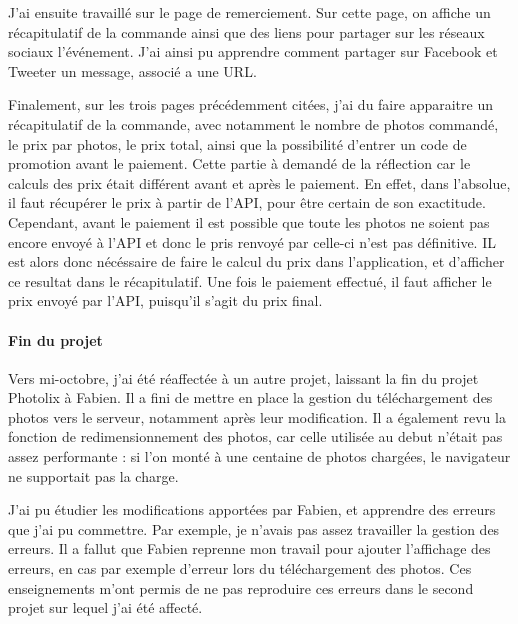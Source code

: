 \documentclass[12pt,a4paper]{article}
\begin{document}
  \bigskip

  J'ai ensuite travaillé sur le page de remerciement. Sur cette page, on
  affiche un récapitulatif de la commande ainsi que des liens pour
  partager sur les réseaux sociaux l'événement. J'ai ainsi pu apprendre
  comment partager sur Facebook et Tweeter un message, associé a une URL.

  \bigskip

  Finalement, sur les trois pages précédemment citées, j'ai du faire
  apparaitre un récapitulatif de la commande, avec notamment le nombre de
  photos commandé, le prix par photos, le prix total, ainsi que la
  possibilité d'entrer un code de promotion avant le paiement. Cette
  partie à demandé de la réflection car le calculs des prix était
  différent avant et après le paiement. En effet, dans l'absolue, il faut
  récupérer le prix à partir de l'API, pour être certain de son
  exactitude. Cependant, avant le paiement il est possible que toute les
  photos ne soient pas encore envoyé à l'API et donc le pris renvoyé par
  celle-ci n'est pas définitive. IL est alors donc nécéssaire de faire le
  calcul du prix dans l'application, et d'afficher ce resultat dans le
  récapitulatif. Une fois le paiement effectué, il faut afficher le prix
  envoyé par l'API, puisqu'il s'agit du prix final.

  \bigskip

  \paragraph{Fin du projet}\label{fin-du-projet}

  \bigskip

  Vers mi-octobre, j'ai été réaffectée à un autre projet, laissant la fin
  du projet Photolix à Fabien. Il a fini de mettre en place la gestion du
  téléchargement des photos vers le serveur, notamment après leur
  modification. Il a également revu la fonction de redimensionnement des
  photos, car celle utilisée au debut n'était pas assez performante : si
  l'on monté à une centaine de photos chargées, le navigateur ne
  supportait pas la charge.

  \bigskip

  J'ai pu étudier les modifications apportées par Fabien, et apprendre des
  erreurs que j'ai pu commettre. Par exemple, je n'avais pas assez
  travailler la gestion des erreurs. Il a fallut que Fabien reprenne mon
  travail pour ajouter l'affichage des erreurs, en cas par exemple
  d'erreur lors du téléchargement des photos. Ces enseignements m'ont
  permis de ne pas reproduire ces erreurs dans le second projet sur lequel
  j'ai été affecté.
\end{document}
